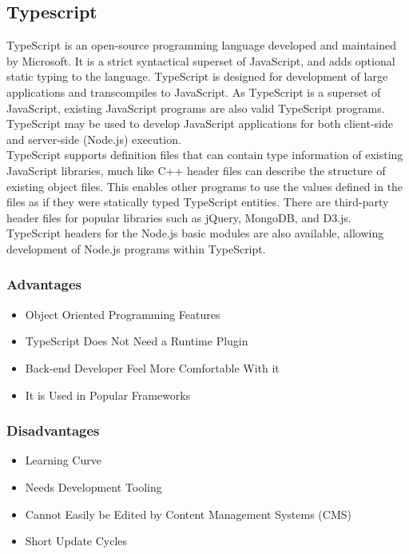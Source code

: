 \documentclass[a4paper, hidelinks, 12pt]{report}
\begin{document}
	

\subsection{Typescript}
TypeScript is an open-source programming language developed and maintained by Microsoft. It is a strict syntactical superset of JavaScript, and adds optional static typing to the language. TypeScript is designed for development of large applications and transcompiles to JavaScript. As TypeScript is a superset of JavaScript, existing JavaScript programs are also valid TypeScript programs. TypeScript may be used to develop JavaScript applications for both client-side and server-side (Node.js) execution.\\
TypeScript supports definition files that can contain type information of existing JavaScript libraries, much like C++ header files can describe the structure of existing object files. This enables other programs to use the values defined in the files as if they were statically typed TypeScript entities. There are third-party header files for popular libraries such as jQuery, MongoDB, and D3.js. TypeScript headers for the Node.js basic modules are also available, allowing development of Node.js programs within TypeScript.

\subsubsection{Advantages}
\begin{itemize}
\item{} Object Oriented Programming Features
\item{} TypeScript Does Not Need a Runtime Plugin
\item{} Back-end Developer Feel More Comfortable With it
\item{} It is Used in Popular Frameworks
\end{itemize}
\subsubsection{Disadvantages}
\begin{itemize}
\item{} Learning Curve
\item{} Needs Development Tooling
\item{} Cannot Easily be Edited by Content Management Systems (CMS)
\item{} Short Update Cycles
\end{itemize}
\end{document}
